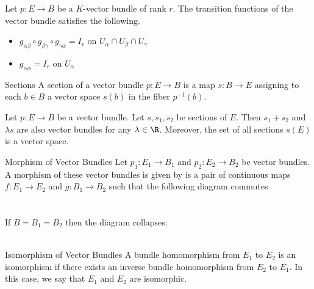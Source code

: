 \documentclass[a4paper]{article}
\begin{document}
\begin{prp}{}{} Let $p:E\to B$ be a $K$-vector bundle of rank $r$. The transition functions of the vector bundle satisfies the following. 
\begin{itemize}
\item $g_{\alpha\beta}\circ g_{\beta\gamma}\circ g_{\gamma\alpha}=I_r$ on $U_\alpha\cap U_\beta\cap U_\gamma$
\item $g_{\alpha\alpha}=I_r$ on $U_\alpha$
\end{itemize}
\end{prp}

\begin{defn}{Sections}{} A section of a vector bundle $p:E\to B$ is a map $s:B\to E$ assigning to each $b\in B$ a vector space $s(b)$ in the fiber $p^{-1}(b)$. 
\end{defn}

\begin{prp}{}{} Let $p:E\to B$ be a vector bundle. Let $s,s_1,s_2$ be sections of $E$. Then $s_1+s_2$ and $\lambda s$ are also vector bundles for any $\lambda\in\R$. Moreover, the set of all sections $s(E)$ is a vector space. 
\end{prp}

\begin{defn}{Morphism of Vector Bundles}{} Let $p_1:E_1\to B_1$ and $p_2:E_2\to B_2$ be vector bundles. A morphism of these vector bundles is given by is a pair of continuous maps $f:E_1\to E_2$ and $g:B_1\to B_2$ such that the following diagram commutes \\~\\
 \\
If $B=B_1=B_2$  then the diagram collapses: \\~\\
\end{defn}

\begin{defn}{Isomorphism of Vector Bundles}{} A bundle homomorphism from $E_1$ to $E_2$ is an isomorphism if there exists an inverse bundle homomorphism from $E_2$ to $E_1$. In this case, we say that $E_1$ and $E_2$ are isomorphic. 
\end{defn}
\end{document}
